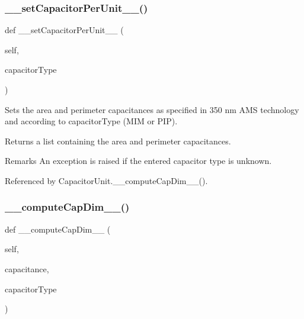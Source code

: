 \subsubsection{\texorpdfstring{\+\_\+\+\_\+set\+Capacitor\+Per\+Unit\+\_\+\+\_\+()}{\_\_setCapacitorPerUnit\_\_()}}
{\footnotesize\ttfamily def \+\_\+\+\_\+set\+Capacitor\+Per\+Unit\+\_\+\+\_\+ (\begin{DoxyParamCaption}\item[{}]{self,  }\item[{}]{capacitor\+Type }\end{DoxyParamCaption})}



Sets the area and perimeter capacitances as specified in 350 nm A\+MS technology and according to {\ttfamily capacitor\+Type} (M\+IM or P\+IP). 

\begin{DoxyReturn}{Returns}
a list containing the area and perimeter capacitances. 
\end{DoxyReturn}
\begin{DoxyRemark}{Remarks}
An exception is raised if the entered capacitor type is unknown. 
\end{DoxyRemark}


Referenced by Capacitor\+Unit.\+\_\+\+\_\+compute\+Cap\+Dim\+\_\+\+\_\+().

\mbox{\label{classpython_1_1capacitorunit_1_1CapacitorUnit_a3fa95cb90eed911f790274f5c90aaa67}} 
\subsubsection{\texorpdfstring{\+\_\+\+\_\+compute\+Cap\+Dim\+\_\+\+\_\+()}{\_\_computeCapDim\_\_()}}
{\footnotesize\ttfamily def \+\_\+\+\_\+compute\+Cap\+Dim\+\_\+\+\_\+ (\begin{DoxyParamCaption}\item[{}]{self,  }\item[{}]{capacitance,  }\item[{}]{capacitor\+Type }\end{DoxyParamCaption})}



